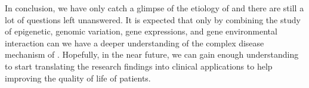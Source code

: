 \documentclass[12pt]{book}
\newcommand*{\glng}{\glsentrylong}
\begin{document}
	In conclusion, we have only catch a glimpse of the etiology of \glng{scz} and there are still a lot of questions left unanswered.
	It is expected that only by combining the study of epigenetic, genomic variation, gene expressions, and gene environmental interaction can we have a deeper understanding of the complex disease mechanism of \glng{scz}.
	Hopefully, in the near future, we can gain enough understanding to start translating the research findings into clinical applications to help improving the quality of life of \glng{scz} patients.
	
	
	\backmatter
	\printbibliography[heading=bibintoc,title={Bibliography}]

\end{document}
